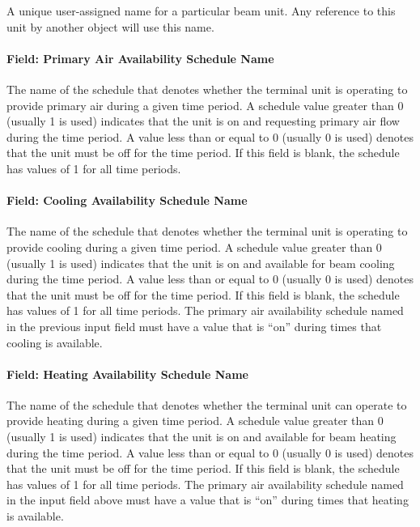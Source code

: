A unique user-assigned name for a particular beam unit. Any reference to this unit by another object will use this name.

\paragraph{Field: Primary Air Availability Schedule Name}\label{field-primary-air-availability-schedule-name}

The name of the schedule that denotes whether the terminal unit is operating to provide primary air during a given time period. A schedule value greater than 0 (usually 1 is used) indicates that the unit is on and requesting primary air flow during the time period. A value less than or equal to 0 (usually 0 is used) denotes that the unit must be off for the time period. If this field is blank, the schedule has values of 1 for all time periods.

\paragraph{Field: Cooling Availability Schedule Name}\label{field-cooling-availability-schedule-name}

The name of the schedule that denotes whether the terminal unit is operating to provide cooling during a given time period. A schedule value greater than 0 (usually 1 is used) indicates that the unit is on and available for beam cooling during the time period. A value less than or equal to 0 (usually 0 is used) denotes that the unit must be off for the time period. If this field is blank, the schedule has values of 1 for all time periods. The primary air availability schedule named in the previous input field must have a value that is ``on'' during times that cooling is available.

\paragraph{Field: Heating Availability Schedule Name}\label{field-heating-availability-schedule-name}

The name of the schedule that denotes whether the terminal unit can operate to provide heating during a given time period. A schedule value greater than 0 (usually 1 is used) indicates that the unit is on and available for beam heating during the time period. A value less than or equal to 0 (usually 0 is used) denotes that the unit must be off for the time period. If this field is blank, the schedule has values of 1 for all time periods. The primary air availability schedule named in the input field above must have a value that is ``on'' during times that heating is available.

